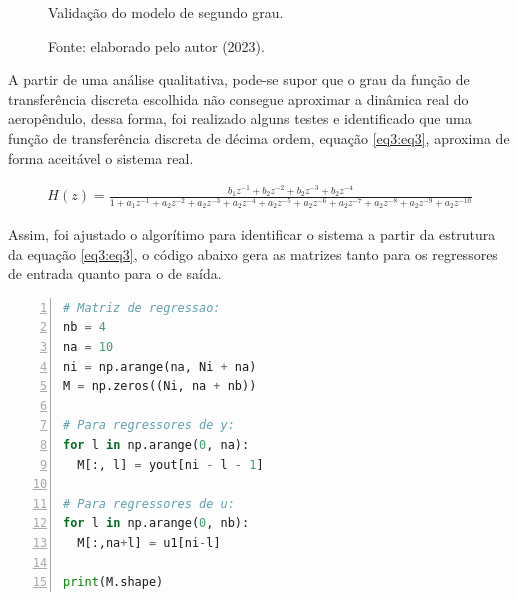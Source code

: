 \begin{figure}[!h]
	\centering
	\caption{Validação do modelo de segundo grau.}
	\caption*{Fonte: elaborado pelo autor (2023).}
	\label{fig3:image_21}
\end{figure}

A partir de uma análise qualitativa, pode-se supor que o grau da função de transferência discreta escolhida não consegue aproximar a dinâmica real do aeropêndulo, dessa forma, foi realizado alguns testes e identificado que uma função de transferência discreta de décima ordem, equação \ref{eq3:eq3}, aproxima de forma aceitável o sistema real.

\begin{align}
H(z) = \frac{b_1z^{-1}+b_2z^{-2}+b_2z^{-3}+b_2z^{-4}}{1+a_1z^{-1}+a_2z^{-2}+a_2z^{-3}+a_2z^{-4}+a_2z^{-5}+a_2z^{-6}+a_2z^{-7}+a_2z^{-8}+a_2z^{-9}+a_2z^{-10}}\label{eq3:eq3}
\end{align}


Assim, foi ajustado o algorítimo para identificar o sistema a partir da estrutura da equação \ref{eq3:eq3}, o código abaixo gera as matrizes tanto para os regressores de entrada quanto para o de saída. 

\vspace{0.5cm}

\begin{lstlisting}[language=python, numbers=left, label=py3, caption={Estruturando os dados para aplicar o método dos mínimos quadrados.}]
# Matriz de regressao:
nb = 4
na = 10
ni = np.arange(na, Ni + na)
M = np.zeros((Ni, na + nb))

# Para regressores de y:
for l in np.arange(0, na):
  M[:, l] = yout[ni - l - 1]

# Para regressores de u:
for l in np.arange(0, nb):
  M[:,na+l] = u1[ni-l]

print(M.shape)
\end{lstlisting}


